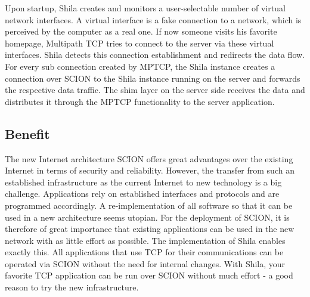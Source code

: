 Upon startup, Shila creates and monitors a user-selectable number of virtual network interfaces. A virtual interface is a fake connection to a network, which is perceived by the computer as a real one. If now someone visits his favorite homepage, Multipath TCP tries to connect to the server via these virtual interfaces. Shila detects this connection establishment and redirects the data flow.  For every sub connection created by MPTCP, the Shila instance creates a connection over SCION to the Shila instance running on the server and forwards the respective data traffic. The shim layer on the server side receives the data and distributes it through the MPTCP functionality to the server application.

\subsection*{Benefit}

The new Internet architecture SCION offers great advantages over the existing Internet in terms of security and reliability. However, the transfer from such an established infrastructure as the current Internet to new technology is a big challenge. Applications rely on established interfaces and protocols and are programmed accordingly. A re-implementation of all software so that it can be used in a new architecture seems utopian. For the deployment of SCION, it is therefore of great importance that existing applications can be used in the new network with as little effort as possible. The implementation of Shila enables exactly this. All applications that use TCP for their communications can be operated via SCION without the need for internal changes. With Shila, your favorite TCP application can be run over SCION without much effort - a good reason to try the new infrastructure.

